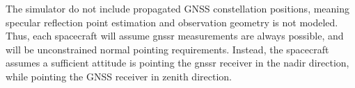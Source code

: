 The simulator do not include propagated GNSS constellation positions, meaning specular reflection point estimation and observation geometry is not modeled. Thus, each spacecraft will assume \gls{gnssr} measurements are always possible, and will be unconstrained normal pointing requirements. Instead, the spacecraft assumes a sufficient attitude is pointing the \gls{gnssr} receiver in the nadir  direction, while pointing the GNSS receiver in zenith direction. 

